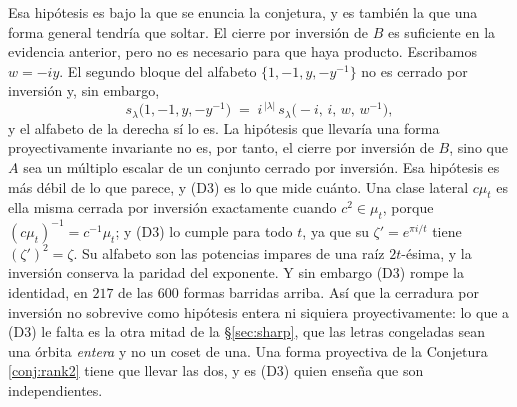 \documentclass[11pt,reqno]{amsart}
\theoremstyle{plain}
\theoremstyle{definition}
\newcommand{\zt}{\mu_t}
\begin{document}
Esa hipótesis es bajo la que se enuncia la conjetura, y es también la que una forma general tendría
que soltar. El cierre por inversión de $B$ es suficiente
en la evidencia anterior, pero no es necesario para que haya producto. Escribamos $w=-iy$. El segundo
bloque del alfabeto $\{1,-1,y,-y^{-1}\}$ no es cerrado por inversión y, sin embargo,
\begin{equation}\label{eq:scalar}
s_\lambda\big(1,-1,y,-y^{-1}\big)\;=\;i^{\,|\lambda|}\,s_\lambda\big(-i,\,i,\,w,\,w^{-1}\big),
\end{equation}
y el alfabeto de la derecha sí lo es. La hipótesis que llevaría una forma proyectivamente invariante
no es, por tanto, el cierre por inversión de $B$, sino que $A$ sea un múltiplo
escalar de un conjunto cerrado por inversión. Esa
hipótesis es más débil de lo que parece, y (D3) es lo que mide cuánto. Una clase lateral $c\zt$ es ella misma
cerrada por inversión exactamente cuando $c^{2}\in\zt$, porque $(c\zt)^{-1}=c^{-1}\zt$; y (D3) lo cumple
para todo $t$, ya que su $\zeta'=e^{\pi i/t}$ tiene $(\zeta')^{2}=\zeta$. Su alfabeto son las potencias
impares de una raíz $2t$-ésima, y la inversión conserva la paridad del exponente. Y sin embargo (D3)
rompe la identidad, en $217$ de las $600$ formas barridas arriba. Así que la cerradura por inversión
no sobrevive como hipótesis entera ni siquiera proyectivamente: lo que a (D3) le falta es la otra
mitad de la \S\ref{sec:sharp}, que las letras congeladas sean una órbita \emph{entera} y no un coset
de una. Una forma proyectiva de la Conjetura \ref{conj:rank2} tiene que llevar las dos, y es (D3)
quien enseña que son independientes.
\end{document}
